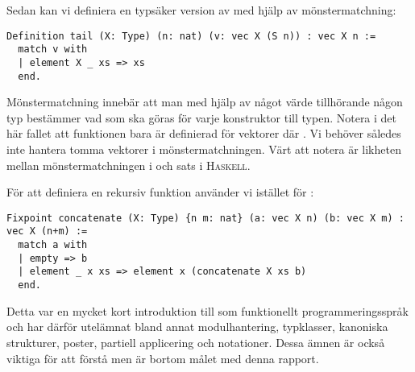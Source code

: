 Sedan kan vi definiera en typsäker version av  med hjälp av
mönstermatchning:
\begin{lstlisting}
Definition tail (X: Type) (n: nat) (v: vec X (S n)) : vec X n :=
  match v with
  | element X _ xs => xs
  end.
\end{lstlisting}
Mönstermatchning innebär att man med hjälp av något värde tillhörande någon typ
bestämmer vad som ska göras för varje konstruktor till typen. Notera i det här
fallet att funktionen bara är definierad för vektorer  där . Vi behöver således inte hantera tomma vektorer i mönstermatchningen. Värt
att notera är likheten mellan mönstermatchningen i \coq{} och  sats i
\textsc{Haskell}.

För att definiera en rekursiv funktion använder vi  istället för
:
\begin{lstlisting}
Fixpoint concatenate (X: Type) {n m: nat} (a: vec X n) (b: vec X m) : vec X (n+m) :=
  match a with
  | empty => b
  | element _ x xs => element x (concatenate X xs b)
  end.
\end{lstlisting}

Detta var en mycket kort introduktion till \coq{} som funktionellt
programmeringsspråk och har därför utelämnat bland annat modulhantering,
typklasser, kanoniska strukturer, poster, partiell applicering och notationer.
Dessa ämnen är också viktiga för att förstå \coq{} men är bortom målet med denna
rapport.
